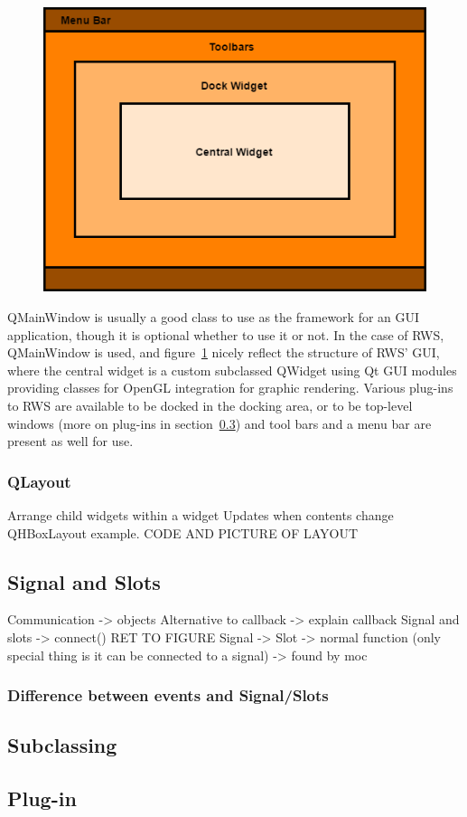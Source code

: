 \begin{figure}[h]
	\centering
	\includegraphics[scale=0.55]{Figures/QMainWindowExample.png}
	\caption{}
	\label{fig:QMainWindowExample}
\end{figure}

QMainWindow is usually a good class to use as the framework for an GUI application, though it is optional whether to use it or not. In the case of RWS, QMainWindow is used, and figure~\ref{fig:QMainWindowExample} nicely reflect the structure of RWS' GUI, where the central widget is a custom subclassed QWidget using Qt GUI modules providing classes for OpenGL integration for graphic rendering. Various plug-ins to RWS are available to be docked in the docking area, or to be top-level windows (more on plug-ins in section~\ref{sec:plugin}) and tool bars and a menu bar are present as well for use.

\subsubsection{QLayout}
\label{sec:QLayout}
Arrange child widgets within a widget
Updates when contents change
QHBoxLayout example. CODE AND PICTURE OF LAYOUT

\subsection{Signal and Slots}
\label{sec:signalandslots}
Communication -> objects
Alternative to callback -> explain callback
Signal and slots -> connect() RET TO FIGURE
Signal -> 
Slot -> normal function (only special thing is it can be connected to a signal) -> found by moc
\subsubsection{Difference between events and Signal/Slots}


\subsection{Subclassing}

\subsection{Plug-in}
\label{sec:plugin}

